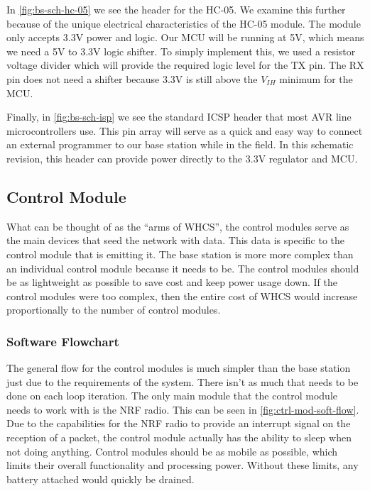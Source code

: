 In \autoref{fig:bs-sch-hc-05} we see the header for the HC-05. We examine this
further because of the unique electrical characteristics of the HC-05 module.
The module only accepts 3.3V power and logic. Our MCU will be running at 5V,
which means we need a 5V to 3.3V logic shifter. To simply implement this, we
used a resistor voltage divider which will provide the required logic level for
the TX pin. The RX pin does not need a shifter because 3.3V is still above the
$V_{IH}$ minimum for the MCU.


Finally, in \autoref{fig:bs-sch-isp} we see the standard ICSP header that most
AVR line microcontrollers use. This pin array will serve as a quick and easy
way to connect an external programmer to our base station while in the field.
In this schematic revision, this header can provide power directly to the 3.3V
regulator and MCU.



\subsection{Control Module}
What can be thought of as the ``arms of WHCS'', the control modules serve as
the main devices that seed the network with data. This data is specific to the
control module that is emitting it. The base station is more more complex than
an individual control module because it needs to be. The control modules should
be as lightweight as possible to save cost and keep power usage down. If the
control modules were too complex, then the entire cost of WHCS would increase
proportionally to the number of control modules.

\subsubsection{Software Flowchart}
The general flow for the control modules is much simpler than the base station
just due to the requirements of the system. There isn't as much that needs to
be done on each loop iteration. The only main module that the control module
needs to work with is the NRF radio. This can be seen in
\autoref{fig:ctrl-mod-soft-flow}. Due to the capabilities
for the NRF radio to provide an interrupt signal on the reception of a packet,
the control module actually has the ability to sleep when not doing anything.
Control modules should be as mobile as possible, which limits their overall
functionality and processing power. Without these limits, any battery attached
would quickly be drained.

